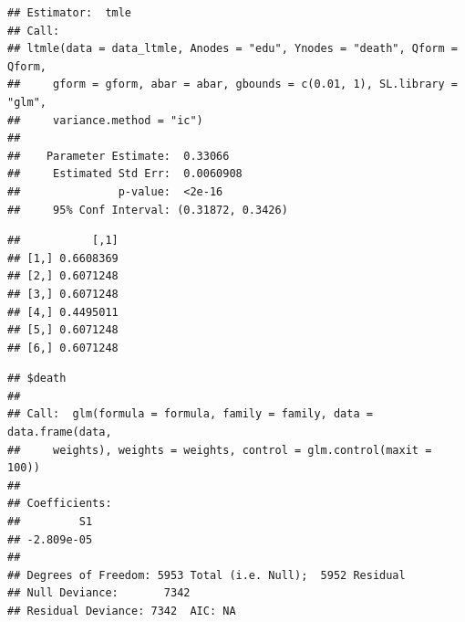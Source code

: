 \documentclass[
]{book}
\newenvironment{Shaded}{\begin{snugshade}}{\end{snugshade}}
\newcommand{\CommentTok}[1]{\textcolor[rgb]{0.56,0.35,0.01}{\textit{#1}}}
\newcommand{\FunctionTok}[1]{\textcolor[rgb]{0.13,0.29,0.53}{\textbf{#1}}}
\newcommand{\NormalTok}[1]{#1}
\newcommand{\SpecialCharTok}[1]{\textcolor[rgb]{0.81,0.36,0.00}{\textbf{#1}}}
\begin{document}
\begin{verbatim}
## Estimator:  tmle 
## Call:
## ltmle(data = data_ltmle, Anodes = "edu", Ynodes = "death", Qform = Qform, 
##     gform = gform, abar = abar, gbounds = c(0.01, 1), SL.library = "glm", 
##     variance.method = "ic")
## 
##    Parameter Estimate:  0.33066 
##     Estimated Std Err:  0.0060908 
##               p-value:  <2e-16 
##     95% Conf Interval: (0.31872, 0.3426)
\end{verbatim}

\begin{Shaded}
\end{Shaded}

\begin{verbatim}
##           [,1]
## [1,] 0.6608369
## [2,] 0.6071248
## [3,] 0.6071248
## [4,] 0.4495011
## [5,] 0.6071248
## [6,] 0.6071248
\end{verbatim}

\begin{Shaded}
\end{Shaded}

\begin{verbatim}
## $death
## 
## Call:  glm(formula = formula, family = family, data = data.frame(data, 
##     weights), weights = weights, control = glm.control(maxit = 100))
## 
## Coefficients:
##         S1  
## -2.809e-05  
## 
## Degrees of Freedom: 5953 Total (i.e. Null);  5952 Residual
## Null Deviance:       7342 
## Residual Deviance: 7342  AIC: NA
\end{verbatim}

\begin{Shaded}
\end{Shaded}
\end{document}
